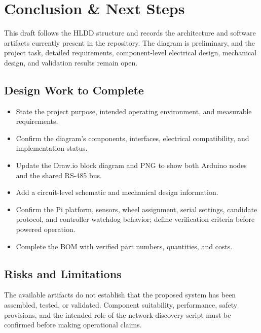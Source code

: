 \section{Conclusion \& Next Steps}

This draft follows the HLDD structure and records the architecture and software artifacts currently present in the repository. The diagram is preliminary, and the project task, detailed requirements, component-level electrical design, mechanical design, and validation results remain open.

\subsection{Design Work to Complete}
\begin{itemize}
    \item State the project purpose, intended operating environment, and measurable requirements.
    \item Confirm the diagram's components, interfaces, electrical compatibility, and implementation status.
    \item Update the Draw.io block diagram and PNG to show both Arduino nodes and the shared RS-485 bus.
    \item Add a circuit-level schematic and mechanical design information.
    \item Confirm the Pi platform, sensors, wheel assignment, serial settings, candidate protocol, and controller watchdog behavior; define verification criteria before powered operation.
    \item Complete the BOM with verified part numbers, quantities, and costs.
\end{itemize}

\subsection{Risks and Limitations}
The available artifacts do not establish that the proposed system has been assembled, tested, or validated. Component suitability, performance, safety provisions, and the intended role of the network-discovery script must be confirmed before making operational claims.
